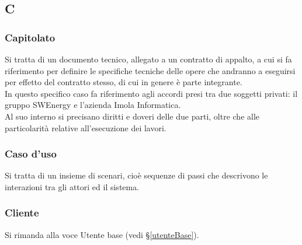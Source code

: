 \subsection{C}

\subsubsection{Capitolato}
Si tratta di un documento tecnico, allegato a un contratto di appalto, a cui si
fa riferimento per definire le specifiche tecniche delle opere che andranno a
eseguirsi per effetto del contratto stesso, di cui in genere è parte integrante.\\
In questo specifico caso fa riferimento agli accordi presi tra due soggetti
privati: il gruppo SWEnergy e l'azienda Imola Informatica. \\
Al suo interno si precisano diritti e doveri delle due parti, oltre che alle
particolarità relative all'esecuzione dei lavori.

\subsubsection{Caso d'uso}
Si tratta di un insieme di scenari, cioè sequenze di passi che descrivono le
interazioni tra gli attori ed il sistema.

\subsubsection{Cliente} 
Si rimanda alla voce Utente base (vedi \S\ref{utenteBase}).

\newpage
